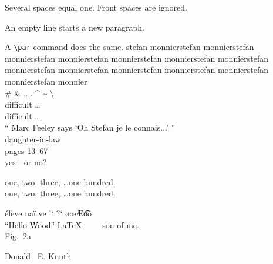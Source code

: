 \documentclass[11pt,oneside,a4paper]{article}
\begin{document}
Several spaces    equal one.
      Front spaces are ignored.

An empty line starts a new paragraph. \par
A \verb|\par| command does the same.
stefan monnierstefan monnierstefan monnierstefan monnierstefan monnierstefan monnierstefan monnierstefan monnierstefan monnierstefan monnierstefan monnierstefan monnierstefan monnierstefan monnier \\

\# \& .... \^{} \~{} \textbackslash \\

difficult \ldots \\
dif{}f{}icult \ldots \\


`` Marc Feeley says `Oh Stefan je le connais...' ''\\

daughter-in-law\\        
pages 13--67 \\
yes---or no?

one, two, three, \dots one hundred.\\
one, two, three, \ldots one hundred.

\'el\`eve na\"i ve !` ?` \o \oe \AE \t{oo} \textregistered \texttrademark\\

``Hello Wood'' \LaTeX \ \ \ \ \ son of me. \\


Fig.~2a \par
Donald ~E. Knuth \par
% 
% 

\end{document}
